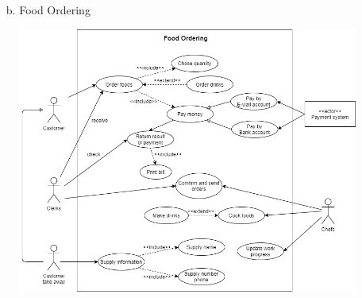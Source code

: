 \documentclass[11pt]{article}
\begin{document}
    \begin{enumerate}
        \item[b.] Food Ordering 
    \end{enumerate}
    \begin{figure}[h]
        \centering
        \includegraphics[scale=0.6]{Use-case diagram/FoodOrdering.png}
    \end{figure}
\end{document}
